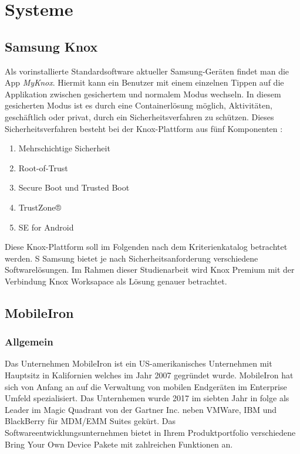 \chapter{Systeme}
\label{cha:systeme}

\section{Samsung Knox}

Als vorinstallierte Standardsoftware aktueller Samsung-Geräten findet man die App \textit{MyKnox}. Hiermit kann ein Benutzer mit einem einzelnen Tippen auf die Applikation zwischen gesichertem und normalem Modus wechseln. In diesem gesicherten Modus ist es durch eine Containerlösung möglich, Aktivitäten, geschäftlich oder privat, durch ein Sicherheitsverfahren zu schützen. Dieses Sicherheitsverfahren besteht bei der Knox-Plattform aus fünf Komponenten \cite{sam2017}:
\begin{enumerate}
\item Mehrschichtige Sicherheit
\item Root-of-Trust
\item Secure Boot und Trusted Boot
\item TrustZone®
\item SE for Android
\end{enumerate}


  Diese Knox-Plattform soll im Folgenden nach dem Kriterienkatalog betrachtet werden.
S
Samsung bietet je nach Sicherheitsanforderung verschiedene Softwarelösungen. Im Rahmen dieser Studienarbeit wird Knox Premium mit der Verbindung Knox Worksapace als Lösung genauer betrachtet.



\section{MobileIron}

\subsection {Allgemein} 
Das Unternehmen MobileIron ist ein US-amerikanisches Unternehmen mit Hauptsitz in Kalifornien welches im Jahr 2007 gegründet wurde. MobileIron hat sich von Anfang an auf die Verwaltung von mobilen Endgeräten im Enterprise Umfeld spezialisiert. Das Unternhemen wurde 2017 im siebten Jahr in folge als Leader im Magic Quadrant von der Gartner Inc. neben VMWare, IBM und BlackBerry für MDM/EMM Suites gekürt. Das Softwareentwicklungsunternehmen bietet in Ihrem Produktportfolio verschiedene Bring Your Own Device Pakete mit zahlreichen Funktionen an. 
